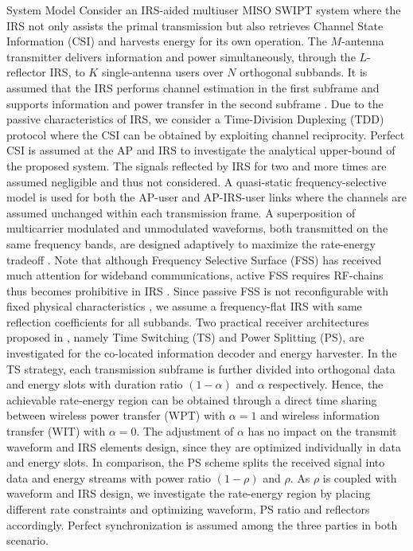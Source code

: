\documentclass{IEEEtran}
\begin{document}
\begin{section} {System Model}
	Consider an IRS-aided multiuser MISO SWIPT system where the IRS not only assists the primal transmission but also retrieves Channel State Information (CSI) and harvests energy for its own operation. The $M$-antenna transmitter delivers information and power simultaneously, through the $L$-reflector IRS, to $K$ single-antenna users over $N$ orthogonal subbands. It is assumed that the IRS performs channel estimation in the first subframe and supports information and power transfer in the second subframe \cite{Zheng2019}. Due to the passive characteristics of IRS, we consider a Time-Division Duplexing (TDD) protocol where the CSI can be obtained by exploiting channel reciprocity. Perfect CSI is assumed at the AP and IRS to investigate the analytical upper-bound of the proposed system. The signals reflected by IRS for two and more times are assumed negligible and thus not considered. A quasi-static frequency-selective model is used for both the AP-user and AP-IRS-user links where the channels are assumed unchanged within each transmission frame. A superposition of multicarrier modulated and unmodulated waveforms, both transmitted on the same frequency bands, are designed adaptively to maximize the rate-energy tradeoff \cite{Clerckx2018b}. Note that although Frequency Selective Surface (FSS) has received much attention for wideband communications, active FSS requires RF-chains thus becomes prohibitive in IRS \cite{Kim2006,Xu2014}. Since passive FSS is not reconfigurable with fixed physical characteristics \cite{Anwar2018}, we assume a frequency-flat IRS with same reflection coefficients for all subbands. Two practical receiver architectures proposed in \cite{Zhang2013}, namely Time Switching (TS) and Power Splitting (PS), are investigated for the co-located information decoder and energy harvester. In the TS strategy, each transmission subframe is further divided into orthogonal data and energy slots with duration ratio $(1 - \alpha)$ and $\alpha$ respectively. Hence, the achievable rate-energy region can be obtained through a direct time sharing between wireless power transfer (WPT) with $\alpha=1$ and wireless information transfer (WIT) with $\alpha=0$. The adjustment of $\alpha$ has no impact on the transmit waveform and IRS elements design, since they are optimized individually in data and energy slots. In comparison, the PS scheme splits the received signal into data and energy streams with power ratio $(1 - \rho)$ and $\rho$. As $\rho$ is coupled with waveform and IRS design, we investigate the rate-energy region by placing different rate constraints and optimizing waveform, PS ratio and reflectors accordingly. Perfect synchronization is assumed among the three parties in both scenario.


\end{section}
\end{document}
